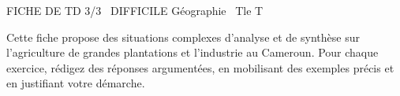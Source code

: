 \documentclass[11pt]{article}
\begin{document}
\begin{tcolorbox}[enhanced,colback=popink,colframe=popink,arc=10pt,boxrule=0pt,left=12pt,right=12pt,top=9pt,bottom=9pt]
{\color{white}\popxbold\small FICHE DE TD 3/3 \textbullet\ DIFFICILE \hfill Géographie \textbullet\ Tle T\par}
\end{tcolorbox}
\vspace{4pt}
Cette fiche propose des situations complexes d'analyse et de synthèse sur l'agriculture de grandes plantations et l'industrie au Cameroun. Pour chaque exercice, rédigez des réponses argumentées, en mobilisant des exemples précis et en justifiant votre démarche.
\end{document}
